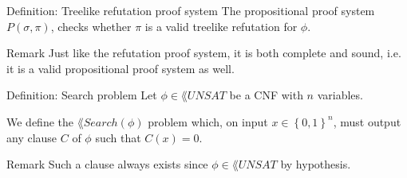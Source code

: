 \documentclass[a4paper]{article}
\begin{document}
\begin{parag}{Definition: Treelike refutation proof system}
    The  propositional proof system $P\left(\sigma, \pi\right)$, checks whether $\pi$ is a valid treelike refutation for $\phi$.

    \begin{subparag}{Remark}
        Just like the refutation proof system, it is both complete and sound, i.e. it is a valid propositional proof system as well.
    \end{subparag}
\end{parag}

\begin{parag}{Definition: Search problem}
    Let $\phi \in \lang{UNSAT}$ be a CNF with $n$ variables.

    We define the $\lang{Search}\left(\phi\right)$ problem which, on input $x \in \left\{0, 1\right\}^n$, must output any clause $C$ of $\phi$ such that $C\left(x\right) = 0$.
    
    \begin{subparag}{Remark}
        Such a clause always exists since $\phi \in \lang{UNSAT}$ by hypothesis.
    \end{subparag}
\end{parag}
\end{document}
